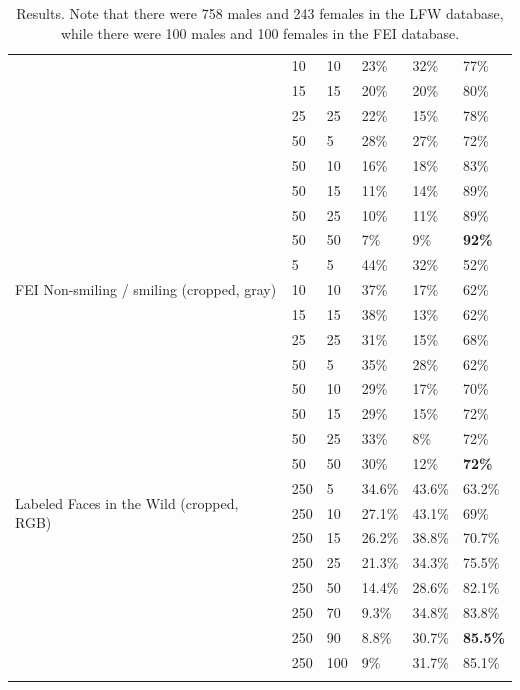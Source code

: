 \documentclass[hidelinks,11pt]{article}
\begin{document}
\begin{appendices}
\begin{longtable}{p{6em} p{5em} p{6em} p{6em} p{6em} p{6em}}
                                & 10  & 10  & 23\%  & 32\%  & 77\% \\
                                & 15  & 15  & 20\%  & 20\%  & 80\% \\
                                & 25  & 25  & 22\%  & 15\%  & 78\% \\
                                & 50  & 5   & 28\%  & 27\%  & 72\% \\
                                & 50  & 10  & 16\%  & 18\%  & 83\% \\
                                & 50  & 15  & 11\%  & 14\%  & 89\% \\
                                & 50  & 25  & 10\%  & 11\%  & 89\% \\
                                & 50  & 50  & 7\%   & 9\%   & \bfseries 92\% \\
      \midrule
      \multirow{3}{6em}{FEI Non-smiling / smiling (cropped, gray)} 
                                & 5   & 5   & 44\%  & 32\%  & 52\% \\
                                & 10  & 10  & 37\%  & 17\%  & 62\% \\
                                & 15  & 15  & 38\%  & 13\%  & 62\% \\
                                & 25  & 25  & 31\%  & 15\%  & 68\% \\
                                & 50  & 5   & 35\%  & 28\%  & 62\% \\
                                & 50  & 10  & 29\%  & 17\%  & 70\% \\
                                & 50  & 15  & 29\%  & 15\%  & 72\% \\
                                & 50  & 25  & 33\%  & 8\%   & 72\% \\
                                & 50  & 50  & 30\%  & 12\%  & \bfseries 72\% \\
      \midrule
      \multirow{3}{6em}{Labeled Faces in the Wild (cropped, RGB)}
                                & 250 & 5   & 34.6\%  & 43.6\%  & 63.2\% \\
                                & 250 & 10  & 27.1\%  & 43.1\%  & 69\% \\
                                & 250 & 15  & 26.2\%  & 38.8\%  & 70.7\% \\
                                & 250 & 25  & 21.3\%  & 34.3\%  & 75.5\% \\
                                & 250 & 50  & 14.4\%  & 28.6\%  & 82.1\% \\
                                & 250 & 70  & 9.3\%   & 34.8\%  & 83.8\% \\
                                & 250 & 90  & 8.8\%   & 30.7\%  & \bfseries 85.5\% \\
                                & 250 & 100 & 9\%     & 31.7\%  & 85.1\% \\
      \bottomrule
    \caption{Results. Note that there were 758 males and 243 females in the LFW
    database, while there were 100 males and 100 females in the FEI database.}
    \label{tab:data}
  \end{longtable}


\end{appendices}
\end{document}
